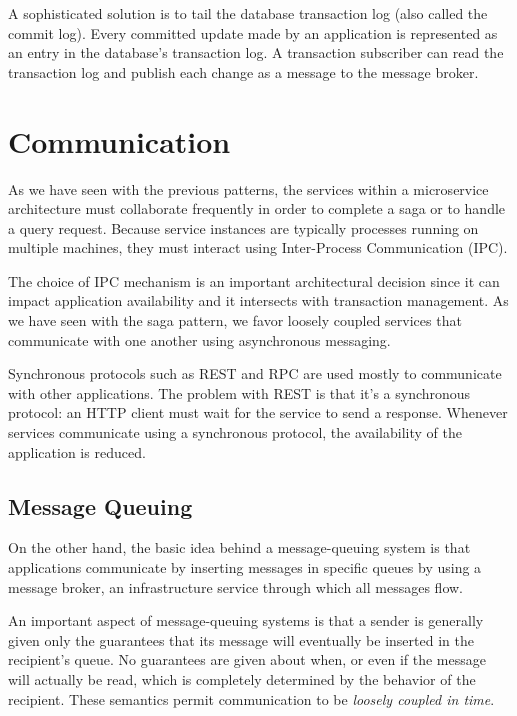 \documentclass[conference]{IEEEtran}
\begin{document}
A sophisticated solution is to tail the database transaction log (also called the commit log). Every committed update made by an application is represented as an entry in the database’s transaction log. A transaction subscriber can read the transaction log and publish each change as a message to the message broker. \cite{log-tailing}

\section{Communication}

As we have seen with the previous patterns, the services within a microservice architecture must collaborate frequently in order to complete a saga or to handle a query request. Because service instances are typically processes running on multiple machines, they must interact using Inter-Process Communication (IPC).

The choice of IPC mechanism is an important architectural decision since it can impact application availability and it intersects with transaction management. As we have seen with the saga pattern, we favor loosely coupled services that communicate with one another using asynchronous messaging.

Synchronous protocols such as REST and RPC are used mostly to communicate with other applications. The problem with REST is that it’s a synchronous protocol: an HTTP client must wait for the service to send a response. Whenever services communicate using a synchronous protocol, the availability of the application is reduced.

\subsection{Message Queuing}

On the other hand, the basic idea behind a message-queuing system is that applications communicate by inserting messages in specific queues by using a message broker, an infrastructure service through which all messages flow.

An important aspect of message-queuing systems is that a sender is generally given only the guarantees that its message will eventually be inserted in the recipient’s queue. No guarantees are given about when, or even if the message will actually be read, which is completely determined by the behavior of the recipient. These semantics permit communication to be \textit{loosely coupled in time}.
\end{document}
